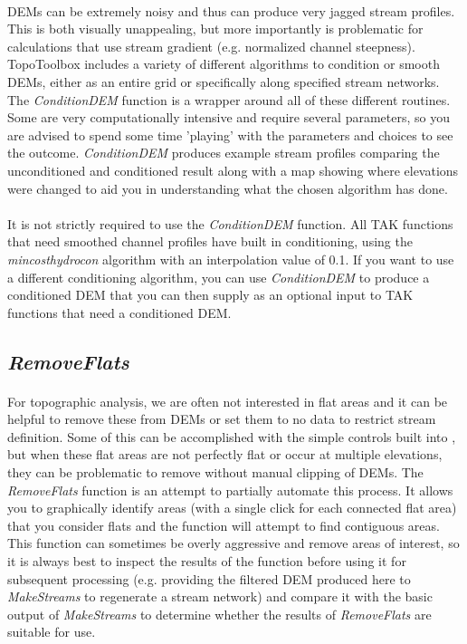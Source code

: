 \paragraph{}DEMs can be extremely noisy and thus can produce very jagged stream profiles. This is both visually unappealing, but more importantly is problematic for calculations that use stream gradient (e.g. normalized channel steepness). TopoToolbox includes a variety of different algorithms to condition or smooth DEMs, either as an entire grid or specifically along specified stream networks. The \textit{ConditionDEM} function is a wrapper around all of these different routines. Some are very computationally intensive and require several parameters, so you are advised to spend some time 'playing' with the parameters and choices to see the outcome. \textit{ConditionDEM} produces example stream profiles comparing the unconditioned and conditioned result along with a map showing where elevations were changed to aid you in understanding what the chosen algorithm has done. 

\paragraph{}It is not strictly required to use the \textit{ConditionDEM} function. All TAK functions that need smoothed channel profiles have built in conditioning, using the \textit{mincosthydrocon} algorithm with an interpolation value of 0.1. If you want to use a different conditioning algorithm, you can use \textit{ConditionDEM} to produce a conditioned DEM that you can then supply as an optional input to TAK functions that need a conditioned DEM.

\subsection{\textit{RemoveFlats}}

\paragraph{}For topographic analysis, we are often not interested in flat areas and it can be helpful to remove these from DEMs or set them to no data to restrict stream definition. Some of this can be accomplished with the simple controls built into , but when these flat areas are not perfectly flat or occur at multiple elevations, they can be problematic to remove without manual clipping of DEMs. The \textit{RemoveFlats} function is an attempt to partially automate this process. It allows you to graphically identify areas (with a single click for each connected flat area) that you consider flats and the function will attempt to find contiguous areas. This function can sometimes be overly aggressive and remove areas of interest, so it is always best to inspect the results of the function before using it for subsequent processing (e.g. providing the filtered DEM produced here to \textit{MakeStreams} to regenerate a stream network) and compare it with the basic output of \textit{MakeStreams} to determine whether the results of \textit{RemoveFlats} are suitable for use.

